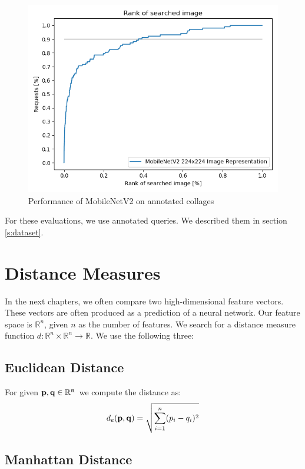\begin{figure}
    \centering
    \includegraphics[width=0.8\linewidth]{img/mobilenet_whole_image.png}
    \caption{Performance of MobileNetV2 on annotated collages}
    \label{fig:mobilenet_whole_image_example}
\end{figure}

For these evaluations, we use annotated queries. We described them in section \ref{s:dataset}.

\section{Distance Measures}

In the next chapters, we often compare two high-dimensional feature vectors. These vectors are often produced as a prediction of a neural network. Our feature space is $\mathbb{R}^n$, given $n$ as the number of features. We search for a distance measure function $d: \mathbb{R}^n \times \mathbb{R}^n \rightarrow \mathbb{R}$. We use the following three:

\subsection{Euclidean Distance}

For given $\bf{p}, \bf{q} \in \mathbb{R}^n$ we compute the distance as:
\begin{equation}
d_e({\bf p},{\bf q}) = \sqrt{\sum_{i=1}^n (p_i - q_i)^2}    
\end{equation}


\subsection{Manhattan Distance}

